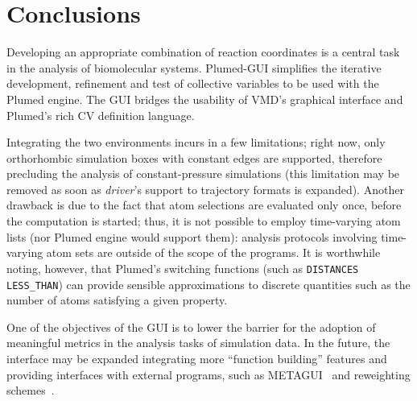 \documentclass[preprint,review,11pt]{elsarticle}
\begin{document}










\section{Conclusions}

Developing an appropriate combination of reaction coordinates is a
central task in the analysis of biomolecular systems.  Plumed-GUI
simplifies the iterative development, refinement and test of
collective variables to be used with the Plumed engine.  The GUI
bridges the usability of VMD's graphical interface and Plumed's rich
CV definition language.  

Integrating the two environments incurs in a few limitations; right
now, only orthorhombic simulation boxes with constant edges are
supported, therefore precluding the analysis of constant-pressure
simulations (this limitation may be removed as soon as \emph{driver}'s
support to trajectory formats is expanded). Another drawback is due to
the fact that atom selections are evaluated only once, before the
computation is started; thus, it is not possible to employ
time-varying atom lists (nor Plumed engine would support them):
analysis protocols involving time-varying atom sets are outside of the
scope of the programs. It is worthwhile noting, however, that Plumed's
switching functions (such as \texttt{DISTANCES LESS\_THAN}) can
provide sensible approximations to discrete quantities such as the
number of atoms satisfying a given property.

One of the objectives of the GUI is to lower the barrier for the
adoption of meaningful metrics in the analysis tasks of simulation
data. In the future, the interface may be expanded integrating more
``function building'' features and providing interfaces with external
programs, such as METAGUI~\cite{Biarnes_Pietrucci_Marinelli_Laio_2012}
and reweighting schemes~\cite{Bonomi_Barducci_Parrinello_2009}.
\end{document}
